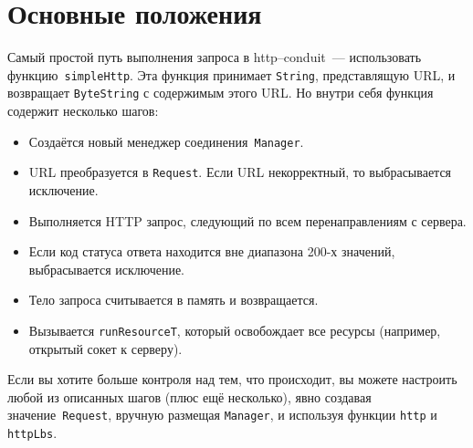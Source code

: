 \section{Основные положения}
Самый простой путь выполнения запроса в http--conduit~--- использовать
функцию~\lstinline!simpleHttp!. Эта функция принимает
\lstinline!String!, представлящую URL, и возвращает
\lstinline!ByteString! с содержимым этого URL. Но внутри себя функция
содержит несколько шагов:
\begin{itemize}
\item Создаётся новый менеджер соединения~\lstinline!Manager!.
\item URL преобразуется в \lstinline!Request!. Если URL некорректный,
  то выбрасывается исключение.
\item Выполняется HTTP запрос, следующий по всем перенаправлениям с сервера.
\item Если код статуса ответа находится вне диапазона 200-х значений,
  выбрасывается исключение.
\item Тело запроса считывается в память и возвращается.
\item Вызывается \lstinline!runResourceT!, который освобождает все
  ресурсы (например, открытый сокет к серверу).
\end{itemize}

Если вы хотите больше контроля над тем, что происходит, вы можете
настроить любой из описанных шагов (плюс ещё несколько), явно создавая
значение~\lstinline!Request!, вручную размещая \lstinline!Manager!, и
используя функции \lstinline!http! и \lstinline!httpLbs!.

